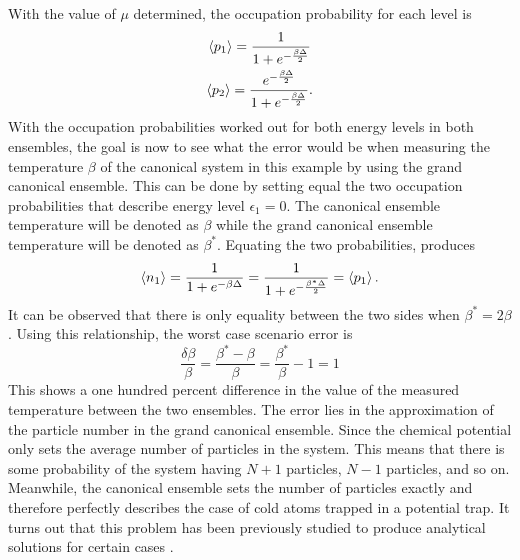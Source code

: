 With the value of $\mu$ determined, the occupation probability for each level is
\begin{gather}
    \left<{p_1}\right>=\frac{1}{1+e^{-\frac{\beta\Delta}{2}}}\\
    \left<{p_2}\right>=\frac{e^{-\frac{\beta\Delta}{2}}}{1+ e^{-\frac{\beta\Delta}{2}}}.
\end{gather}
With the occupation probabilities worked out for both energy levels in both ensembles, the goal is now to see what the error would be when measuring the temperature $\beta$ of the canonical system in this example by using the grand canonical ensemble. This can be done by setting equal the two occupation probabilities that describe energy level $\epsilon_1=0$. The canonical ensemble temperature will be denoted as $\beta$ while the grand canonical ensemble temperature will be denoted as $\beta^*$. 
Equating the two probabilities, produces 
\begin{gather}
    \left<{n_1}\right>=\frac{1}{1+e^{-\beta\Delta}}=\frac{1}{1+e^{-\frac{\beta^*\Delta}{2}}}=\left<{p_1}\right>.
\end{gather}
It can be observed that there is only equality between the two sides when $\beta^*=2\beta$. Using this relationship, the worst case scenario error is
\begin{equation}
    \frac{\delta\beta}{\beta}=\frac{\beta^*-\beta}{\beta}=\frac{\beta^*}{\beta}-1=1
\end{equation}
This shows a one hundred percent difference in the value of the measured temperature between the two ensembles. The error lies in the approximation of the particle number in the grand canonical ensemble. Since the chemical potential only sets the average number of particles in the system. This means that there is some probability of the system having $N+1$ particles, $N-1$ particles, and so on. Meanwhile, the canonical ensemble sets the number of particles exactly and therefore perfectly describes the case of cold atoms trapped in a potential trap. It turns out that this problem has been previously studied to produce analytical solutions for certain cases \cite{Hatem2020} \cite{Borr1993} \cite{Schon1996}.

